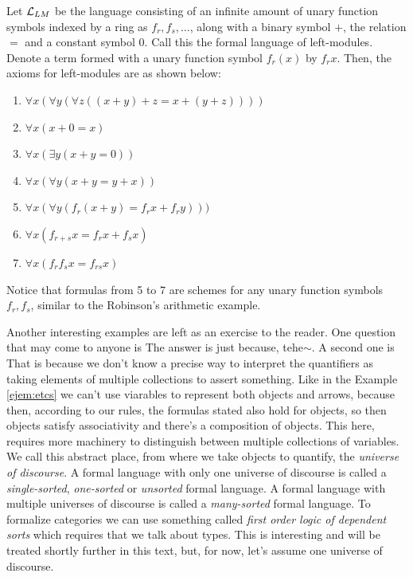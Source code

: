 \begin{ejem}
	Let $\mathcal{L}_{LM}$ be the language consisting of an infinite amount of unary function symbols indexed by a ring as $f_r, f_s, \ldots$, along with a binary symbol $+$, the relation $=$ and a constant symbol $0$. Call this the formal language of left-modules. Denote a term formed with a unary function symbol $f_r(x)$ by $f_rx$. Then, the axioms for left-modules are as shown below:
	\begin{enumerate}
		\item $\forall x (\forall y( \forall z ((x + y) + z = x + (y + z)) ) )$
		\item $\forall x (x + 0 = x)$
		\item $\forall x ( \exists y (x + y = 0))$
		\item $\forall x (\forall y (x + y = y + x))$
		\item[5$_{s}$.] $\forall x (\forall y (f_r(x + y) = f_rx + f_ry)))$ 
		\item[6$_{s}$.] $\forall x (f_{r+s}x = f_rx + f_sx) $
		\item[7$_{s}$.] $\forall x (f_rf_sx = f_{rs}x)$
	\end{enumerate}

	Notice that formulas from 5 to 7 are schemes for any unary function symbols $f_r, f_s$, similar to the Robinson's arithmetic example.
\end{ejem}

Another interesting examples are left as an exercise to the reader. One question that may come to anyone is  The answer is just because, tehe$\sim$. A second one is  That is because we don't know a precise way to interpret the quantifiers as taking elements of multiple collections to assert something. Like in the Example \ref{ejem:etcs} we can't use viarables to represent both objects and arrows, because then, according to our rules, the formulas stated also hold for objects, so then objects satisfy associativity and there's a composition of objects. This here, requires more machinery to distinguish between multiple collections of variables. We call this abstract place, from where we take objects to quantify, the \textit{universe of discourse}. A formal language with only one universe of discourse is called a \textit{single-sorted}, \textit{one-sorted} or \textit{unsorted} formal language. A formal language with multiple universes of discourse is called a \textit{many-sorted} formal language. To formalize categories we can use something called \textit{first order logic of dependent sorts} which requires that we talk about types. This is interesting and will be treated shortly further in this text, but, for now, let's assume one universe of discourse.

